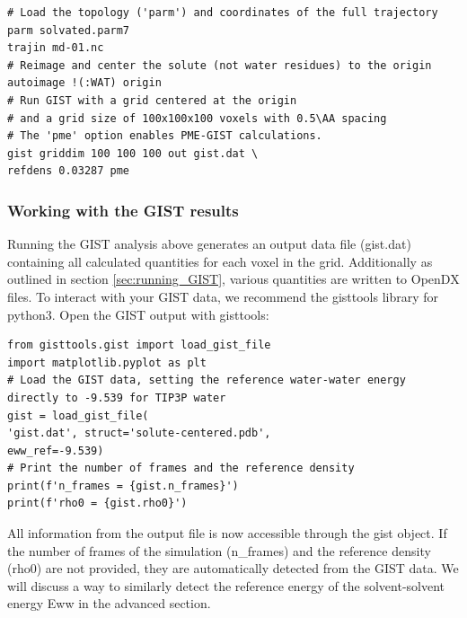 \documentclass[9pt,tutorial]{livecoms}
\begin{document}
\begin{lstlisting}[style=cpptraj]
# Load the topology ('parm') and coordinates of the full trajectory
parm solvated.parm7
trajin md-01.nc
# Reimage and center the solute (not water residues) to the origin
autoimage !(:WAT) origin
# Run GIST with a grid centered at the origin
# and a grid size of 100x100x100 voxels with 0.5\AA spacing
# The 'pme' option enables PME-GIST calculations.
gist griddim 100 100 100 out gist.dat \
refdens 0.03287 pme
\end{lstlisting}
\subsubsection{Working with the GIST results}
Running the GIST analysis above generates an output data file (gist.dat) containing all calculated quantities for each voxel in the grid. 
Additionally as outlined in section \ref{sec:running_GIST}, various quantities are written to OpenDX files.
To interact with your GIST data, we recommend the gisttools library for python3. Open the GIST output with gisttools:
\begin{lstlisting}[style=python]
from gisttools.gist import load_gist_file
import matplotlib.pyplot as plt
# Load the GIST data, setting the reference water-water energy directly to -9.539 for TIP3P water
gist = load_gist_file(
'gist.dat', struct='solute-centered.pdb',  
eww_ref=-9.539)
# Print the number of frames and the reference density
print(f'n_frames = {gist.n_frames}')
print(f'rho0 = {gist.rho0}')
\end{lstlisting}
All information from the output file is now accessible through the gist object. 
If the number of frames of the simulation (n\_frames) and the reference density (rho0) are not provided, they are automatically detected from the GIST data. 
We will discuss a way to similarly detect the reference energy of the solvent-solvent energy Eww in the advanced section.
\end{document}
